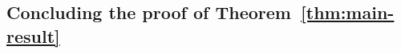 \documentclass[sigplan,9pt]{acmart}\settopmatter{printfolios=true,printccs=false,printacmref=false}
\newcounter{thm}
\theoremstyle{definition}
\newcommand{\La}[0]{{\mathcal{L}}}
\newcommand{\Ff}[0]{{\mathfrak{F}}}
\newcommand{\Pa}[0]{{\mathcal{P}}}
\begin{document}
%
%
%
%


\subsection{Concluding the proof of Theorem~\ref{thm:main-result}}\label{rect:result-proof}
\end{document}
